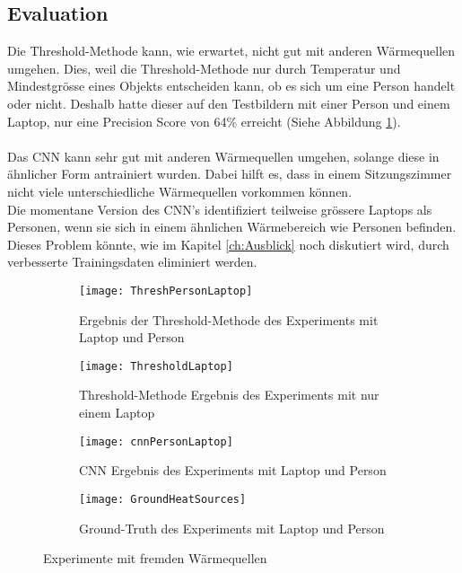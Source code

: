 \subsection{Evaluation}

Die Threshold-Methode kann, wie erwartet, nicht gut mit anderen Wärmequellen umgehen. Dies, weil die Threshold-Methode nur durch Temperatur und Mindestgrösse eines Objekts entscheiden kann, ob es sich um eine Person handelt oder nicht. Deshalb hatte dieser auf den Testbildern mit einer Person und einem Laptop, nur eine Precision Score von 64\% erreicht (Siehe Abbildung \ref{fig:ThreshPersonLaptop}).\\
\\
Das \gls{CNN} kann sehr gut mit anderen Wärmequellen umgehen, solange diese in ähnlicher Form antrainiert wurden. Dabei hilft es, dass in einem Sitzungszimmer nicht viele unterschiedliche Wärmequellen vorkommen können. \\
Die momentane Version des \gls{CNN}'s identifiziert teilweise grössere Laptops als Personen, wenn sie sich in einem ähnlichen Wärmebereich wie Personen befinden. Dieses Problem könnte, wie im Kapitel \ref{ch:Ausblick} noch diskutiert wird, durch verbesserte Trainingsdaten eliminiert werden.

\vspace{.5em}
\begin{figure}[H]
	\begin{subfigure}{.45\linewidth}
		\centering
		\texttt{[image: ThreshPersonLaptop]}
		\caption{Ergebnis der Threshold-Methode des Experiments mit Laptop und Person}
		\label{fig:ThreshPersonLaptop}
	\end{subfigure}\hfill%
	\begin{subfigure}{.45\linewidth}
		\centering
		\texttt{[image: ThresholdLaptop]}
		\caption{Threshold-Methode Ergebnis des Experiments mit nur einem Laptop}
		\label{fig:thresholdLaptop}
	\end{subfigure}
\begin{subfigure}{.45\linewidth}
	\centering
	\texttt{[image: cnnPersonLaptop]}
	\caption{\gls{CNN} Ergebnis des Experiments mit Laptop und Person}
	\label{fig:cnnPersonLaptop}
\end{subfigure}
	\begin{subfigure}{.55\linewidth}
		\centering
		\texttt{[image: GroundHeatSources]}
		\caption{Ground-Truth des Experiments mit Laptop und Person}
		\label{fig:groundPersonLaptop}
	\end{subfigure}
	\caption{Experimente mit fremden Wärmequellen}
	\label{fig:HeatSources}
\end{figure}
\vspace{.5em}



